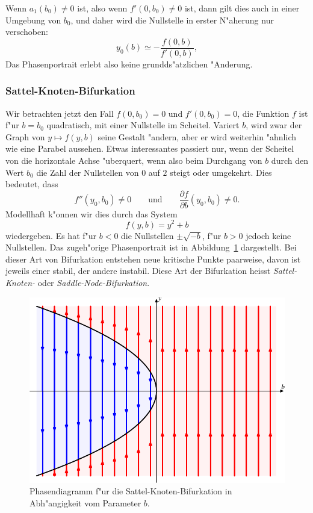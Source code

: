 Wenn $a_1(b_0)\ne0$ ist, also wenn $f'(0, b_0)\ne 0$ ist, dann 
gilt dies auch in einer Umgebung von $b_0$, und daher wird die
Nullstelle in erster N"aherung nur verschoben:
\[
y_0(b) \simeq -\frac{f(0,b)}{f'(0,b)},
\]
Das Phasenportrait erlebt also keine grundds"atzlichen "Anderung.

\subsubsection{Sattel-Knoten-Bifurkation}
Wir betrachten jetzt den Fall $f(0,b_0)=0$ und $f'(0,b_0)=0$, die Funktion
$f$ ist f"ur $b=b_0$ quadratisch, mit einer Nullstelle im Scheitel.
Variert $b$, wird zwar der Graph von $y\mapsto f(y,b)$ seine
Gestalt "andern, aber er wird weiterhin "ahnlich wie eine Parabel
aussehen.
Etwas interessantes passiert nur, wenn der Scheitel von die horizontale
Achse "uberquert, wenn also beim Durchgang von $b$ durch den Wert $b_0$
die Zahl der Nullstellen von $0$ auf $2$ steigt oder umgekehrt.
Dies bedeutet, dass 
\[
f''(y_0,b_0)\ne 0
\qquad
\text{und}
\qquad
\frac{\partial f}{\partial b}(y_0, b_0)\ne 0.
\]
Modellhaft k"onnen wir dies durch das System
\[
f(y,b)=y^2+b
\]
wiedergeben.
Es hat f"ur $b<0$ die Nullstellen $\pm\sqrt{-b}$, f"ur $b>0$ jedoch
keine Nullstellen.
Das zugeh"orige Phasenportrait ist in Abbildung~\ref{geometrie:saddle-node}
dargestellt.
Bei dieser Art von Bifurkation entstehen neue kritische Punkte
paarweise, davon ist jeweils einer stabil, der andere instabil.
Diese Art der Bifurkation heisst {\em Sattel-Knoten-}
oder {\em Saddle-Node-Bifurkation}.

\begin{figure}
\centering
\includegraphics{chapters/images/bifurkation-1.pdf}
\caption{Phasendiagramm f"ur die Sattel-Knoten-Bifurkation in
Abh"angigkeit vom Parameter $b$.
\label{geometrie:saddle-node}}
\end{figure}

